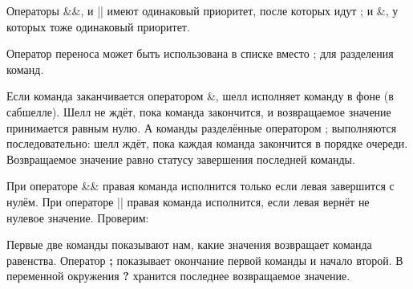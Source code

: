 \documentclass[a4paper]{article}
\begin{document}
Операторы \&\&, и || имеют одинаковый приоритет, после которых идут ; и \&, у которых тоже одинаковый приоритет.

Оператор переноса может быть использована в списке вместо ; для разделения команд.

Если команда заканчивается оператором \&, шелл исполняет команду в фоне (в сабшелле). Шелл не ждёт, пока команда закончится, и возвращаемое значение принимается равным нулю. А команды разделённые оператором ; выполняются последовательно: шелл ждёт, пока каждая команда закончится в порядке очереди. Возвращаемое значение равно статусу завершения последней команды.

При операторе \&\& правая команда исполнится только если левая завершится с нулём.
При операторе || правая команда исполнится, если левая вернёт не нулевое значение. Проверим:

Первые две команды показывают нам, какие значения возвращает команда равенства. Оператор \textbf{;} показывает окончание первой команды и начало второй. В переменной окружения \textbf{?} хранится последнее возвращаемое значение.
\end{document}
